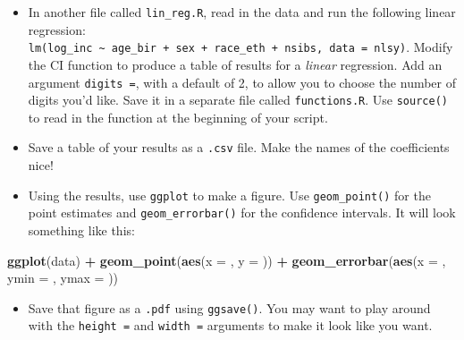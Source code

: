 \documentclass[11pt]{scrartcl}
\newenvironment{Shaded}{\begin{snugshade}}{\end{snugshade}}
\newcommand{\DataTypeTok}[1]{\textcolor[rgb]{0.13,0.29,0.53}{#1}}
\newcommand{\KeywordTok}[1]{\textcolor[rgb]{0.13,0.29,0.53}{\textbf{#1}}}
\newcommand{\NormalTok}[1]{#1}
\newcommand{\OperatorTok}[1]{\textcolor[rgb]{0.81,0.36,0.00}{\textbf{#1}}}
\newcommand{\StringTok}[1]{\textcolor[rgb]{0.31,0.60,0.02}{#1}}
\providecommand{\tightlist}{%
  \setlength{\itemsep}{0pt}\setlength{\parskip}{0pt}}
\begin{document}
\begin{itemize}
\tightlist
\item
  In another file called \texttt{lin\_reg.R}, read in the data and run
  the following linear regression:
  \texttt{lm(log\_inc\ \textasciitilde{}\ age\_bir\ +\ sex\ +\ race\_eth\ +\ nsibs,\ data\ =\ nlsy)}.
  Modify the CI function to produce a table of results for a
  \emph{linear} regression. Add an argument \texttt{digits\ =}, with a
  default of 2, to allow you to choose the number of digits you'd like.
  Save it in a separate file called \texttt{functions.R}. Use
  \texttt{source()} to read in the function at the beginning of your
  script.
\item
  Save a table of your results as a \texttt{.csv} file. Make the names
  of the coefficients nice!
\item
  Using the results, use \texttt{ggplot} to make a figure. Use
  \texttt{geom\_point()} for the point estimates and
  \texttt{geom\_errorbar()} for the confidence intervals. It will look
  something like this:
\end{itemize}

\begin{Shaded}
\begin{Highlighting}[]
\KeywordTok{ggplot}\NormalTok{(data) }\OperatorTok{+}\StringTok{ }
\StringTok{  }\KeywordTok{geom_point}\NormalTok{(}\KeywordTok{aes}\NormalTok{(}\DataTypeTok{x =}\NormalTok{ , }\DataTypeTok{y =}\NormalTok{ )) }\OperatorTok{+}\StringTok{ }
\StringTok{  }\KeywordTok{geom_errorbar}\NormalTok{(}\KeywordTok{aes}\NormalTok{(}\DataTypeTok{x =}\NormalTok{ , }\DataTypeTok{ymin =}\NormalTok{ , }\DataTypeTok{ymax =}\NormalTok{ ))}
\end{Highlighting}
\end{Shaded}

\begin{itemize}
\tightlist
\item
  Save that figure as a \texttt{.pdf} using \texttt{ggsave()}. You may
  want to play around with the \texttt{height\ =} and \texttt{width\ =}
  arguments to make it look like you want.
\end{itemize}
\end{document}
